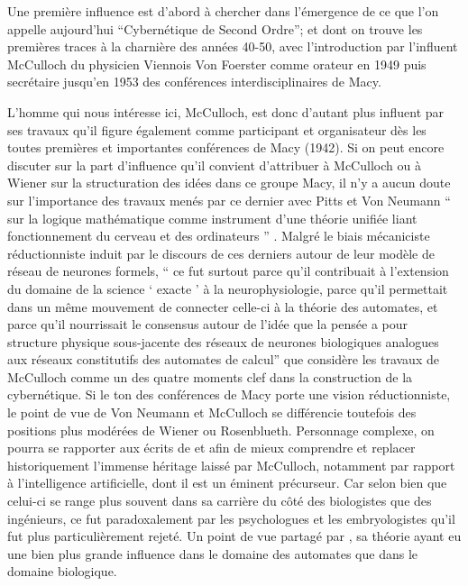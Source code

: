 Une première influence est d'abord à chercher dans l'émergence de ce que l'on appelle aujourd'hui \enquote{Cybernétique de Second Ordre}; et dont on trouve les premières traces à la charnière des années 40-50, avec l'introduction par l'influent McCulloch du physicien Viennois Von Foerster comme orateur en 1949 puis secrétaire jusqu'en 1953 des conférences interdisciplinaires de Macy.

L'homme qui nous intéresse ici, McCulloch, est donc d'autant plus influent par ses travaux qu'il figure également comme participant et organisateur dès les toutes premières et importantes conférences de Macy (1942). Si on peut encore discuter sur la part d'influence qu'il convient d'attribuer à McCulloch ou à Wiener sur la structuration des idées dans ce groupe Macy, il n'y a aucun doute sur l'importance des travaux menés par ce dernier avec Pitts et Von Neumann \enquote{ sur la logique mathématique comme instrument d'une théorie unifiée liant fonctionnement du cerveau et des ordinateurs } \autocite[777]{Pouvreau2013}. 
Malgré le biais mécaniciste réductionniste \textcite[783-784]{Pouvreau2013} induit par le discours de ces derniers autour de leur modèle de réseau de neurones formels, \enquote{ ce fut surtout parce qu’il contribuait à l’extension du domaine de la science \enquote{ exacte } à la neurophysiologie, parce qu’il permettait dans un même mouvement de connecter celle-ci à la théorie des automates, et parce qu’il nourrissait le consensus autour de l’idée que la pensée a pour structure physique sous-jacente des réseaux de neurones biologiques analogues aux réseaux constitutifs des automates de calcul} que \autocite[777]{Pouvreau2013} considère les travaux de McCulloch comme un des quatre moments clef dans la construction de la cybernétique. Si le ton des conférences de Macy porte une vision réductionniste, le point de vue de Von Neumann et McCulloch se différencie toutefois des positions plus modérées de Wiener ou Rosenblueth. Personnage complexe, on pourra se rapporter aux écrits de \textcite{Dupuy2005} et \textcite{Levy1985} afin de mieux comprendre et replacer historiquement l'immense héritage laissé par McCulloch, notamment par rapport à l'intelligence artificielle, dont il est un éminent précurseur. Car selon \textcite{Dupuy2005} bien que celui-ci se range plus souvent dans sa carrière du côté des biologistes que des ingénieurs, ce fut paradoxalement par les psychologues et les embryologistes qu'il fut plus particulièrement rejeté. Un point de vue partagé par \textcite[778]{Pouvreau2013}, sa théorie ayant eu une bien plus grande influence dans le domaine des automates que dans le domaine biologique.

